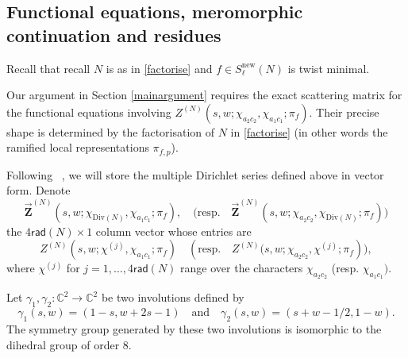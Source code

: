 \documentclass[12pt,reqno]{amsart}
\theoremstyle{plain}
\theoremstyle{remark}
\numberwithin{equation}{section}
\numberwithin{lemma}{section}
\numberwithin{theorem}{section}
\numberwithin{prop}{section}
\numberwithin{remark}{section}
\begin{document}
\subsection{Functional equations, meromorphic continuation and residues}
Recall that recall $N$ is as in \eqref{factorise} and $f \in S_{\ell}^{\text{new}}(N)$ 
is twist minimal. 

Our argument in Section \ref{mainargument}
requires the exact scattering matrix for the functional equations involving
$Z^{(N)}(s,w;\chi_{a_2 c_2}, \chi_{a_1 c_1};\pi_f)$. Their precise shape 
is determined by the factorisation of $N$ in  \eqref{factorise}
(in other words the ramified local representations $\pi_{f,p}$). 

Following ~\cite[Section~4]{DGH}, we will store the multiple Dirichlet 
series defined above in vector form. 
Denote 
\begin{equation*}
\overrightarrow{\boldsymbol{Z}}^{(N)}(s,w; \chi_{\text{Div}(N)}, \chi_{a_1 c_1};\pi_f), \quad  
\big(\text{resp.} \quad \overrightarrow{\boldsymbol{Z}}^{(N)}(s,w; \chi_{a_2 c_2}, \chi_{\text{Div}(N)};\pi_f) \big)
\end{equation*}
the $4 \mathsf{rad}(N) \times 1$ column vector whose entries are 
\begin{equation*}
Z^{(N)}(s,w; \chi^{(j)}, \chi_{a_1 c_1};\pi_f) \quad (\text{resp.} \quad
Z^{(N)} \big(s,w; \chi_{a_2 c_2},\chi^{(j)} ;\pi_f) \big),
\end{equation*}
where $\chi^{(j)}$ for $j=1,\ldots,4 \mathsf{rad}(N)$ range 
over the characters $\chi_{a_2 c_2}$ (resp. $\chi_{a_1 c_1})$.

Let $\gamma_1,\gamma_2: \mathbb{C}^2 \rightarrow \mathbb{C}^2$ be 
two involutions defined by 
\begin{equation*}
\gamma_1(s,w)=(1-s,w+2s-1) \quad \text{and} \quad \gamma_2(s,w)=(s+w-1/2,1-w).
\end{equation*}
The symmetry group generated by these two involutions is isomorphic to the dihedral
group of order $8$.
\end{document}

